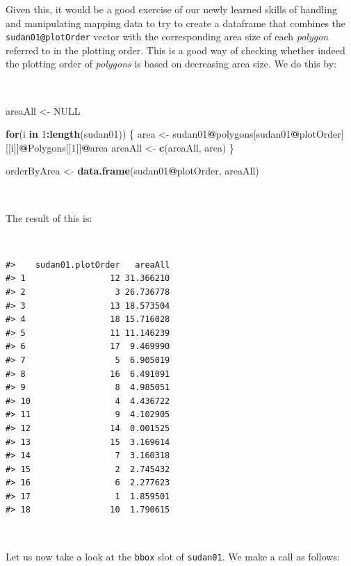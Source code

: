 \documentclass[12pt,a4paper,a4paper]{book}
\newenvironment{Shaded}{\begin{snugshade}}{\end{snugshade}}
\newcommand{\KeywordTok}[1]{\textcolor[rgb]{0.13,0.29,0.53}{\textbf{#1}}}
\newcommand{\DecValTok}[1]{\textcolor[rgb]{0.00,0.00,0.81}{#1}}
\newcommand{\StringTok}[1]{\textcolor[rgb]{0.31,0.60,0.02}{#1}}
\newcommand{\OtherTok}[1]{\textcolor[rgb]{0.56,0.35,0.01}{#1}}
\newcommand{\ControlFlowTok}[1]{\textcolor[rgb]{0.13,0.29,0.53}{\textbf{#1}}}
\newcommand{\OperatorTok}[1]{\textcolor[rgb]{0.81,0.36,0.00}{\textbf{#1}}}
\newcommand{\NormalTok}[1]{#1}
\theoremstyle{definition}
\theoremstyle{definition}
\theoremstyle{definition}
\theoremstyle{remark}
\begin{document}
Given this, it would be a good exercise of our newly learned skills of
handling and manipulating mapping data to try to create a dataframe that
combines the \texttt{sudan01@plotOrder} vector with the corresponding
area size of each \emph{polygon} referred to in the plotting order. This
is a good way of checking whether indeed the plotting order of
\emph{polygons} is based on decreasing area size. We do this by:

~

\begin{Shaded}
\begin{Highlighting}[]
\NormalTok{areaAll <-}\StringTok{ }\OtherTok{NULL}
    
\ControlFlowTok{for}\NormalTok{(i }\ControlFlowTok{in} \DecValTok{1}\OperatorTok{:}\KeywordTok{length}\NormalTok{(sudan01)) \{}
\NormalTok{  area <-}\StringTok{ }\NormalTok{sudan01}\OperatorTok{@}\NormalTok{polygons[sudan01}\OperatorTok{@}\NormalTok{plotOrder][[i]]}\OperatorTok{@}\NormalTok{Polygons[[}\DecValTok{1}\NormalTok{]]}\OperatorTok{@}\NormalTok{area}
\NormalTok{  areaAll <-}\StringTok{ }\KeywordTok{c}\NormalTok{(areaAll, area)}
\NormalTok{\}}

\NormalTok{orderByArea <-}\StringTok{ }\KeywordTok{data.frame}\NormalTok{(sudan01}\OperatorTok{@}\NormalTok{plotOrder, areaAll)}
\end{Highlighting}
\end{Shaded}

~

The result of this is:

~

\begin{verbatim}
#>    sudan01.plotOrder   areaAll
#> 1                 12 31.366210
#> 2                  3 26.736778
#> 3                 13 18.573504
#> 4                 18 15.716028
#> 5                 11 11.146239
#> 6                 17  9.469990
#> 7                  5  6.905019
#> 8                 16  6.491091
#> 9                  8  4.985051
#> 10                 4  4.436722
#> 11                 9  4.102905
#> 12                14  0.001525
#> 13                15  3.169614
#> 14                 7  3.160318
#> 15                 2  2.745432
#> 16                 6  2.277623
#> 17                 1  1.859501
#> 18                10  1.790615
\end{verbatim}

~

Let us now take a look at the \texttt{bbox} slot of \texttt{sudan01}. We
make a call as follows:
\end{document}
